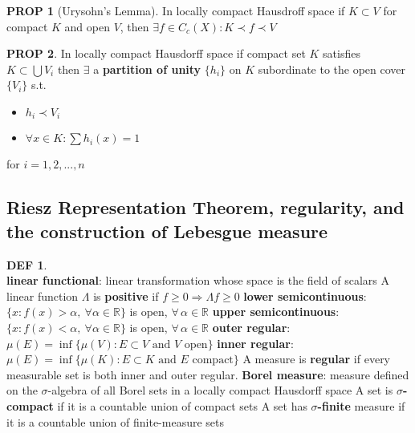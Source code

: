 \documentclass[hidelinks,10pt]{article}
\theoremstyle{definition}
\newtheorem*{defin}{DEF}
\theoremstyle{dotles}
\theoremstyle{dotless}
\newtheorem{proposition}{PROP}[section]
\theoremstyle{remark}
\begin{document}
\begin{proposition}[Urysohn's Lemma] In locally compact Hausdroff space if $K\subset V$ for compact $K$ and open $V$, then $\exists f\in C_c(X):K\prec f\prec V$
\end{proposition}

\begin{proposition}In locally compact Hausdorff space if compact set $K$ satisfies $K\subset\bigcup V_i$ then $\exists$ a \textbf{partition of unity} $\{h_i\}$ on $K$ subordinate to the open cover $\{V_i\}$ s.t.\begin{itemize}
    \item $h_i\prec V_i$
    \item $\forall x\in K:\sum h_i(x)=1$
\end{itemize}
for $i=1,2,...,n$
\end{proposition}

\subsection{Riesz Representation Theorem, regularity, and the construction of Lebesgue measure}

\begin{defin}~\\
\textbf{linear functional}: linear transformation whose space is the field of scalars\newline
A linear function $\Lambda$ is \textbf{positive} if $f\geq0\Rightarrow\Lambda f\geq0$\bigbreak
\textbf{lower semicontinuous}: $\{x:f(x)>\alpha,\ \forall\alpha\in\mathbb{R}\}$ is open, $\forall\,\alpha\in\mathbb{R}$\newline
\textbf{upper semicontinuous}: $\{x:f(x)<\alpha,\ \forall\alpha\in\mathbb{R}\}$ is open, $\forall\,\alpha\in\mathbb{R}$\bigbreak
\textbf{outer regular}: $\mu(E)=\inf\{\mu(V):E\subset V\textrm{ and }V\textrm{ open}\}$\newline
\textbf{inner regular}: $\mu(E)=\inf\{\mu(K):E\subset K\textrm{ and }E\textrm{ compact}\}$\newline
A measure is \textbf{regular} if every measurable set is both inner and outer regular.\bigbreak
\textbf{Borel measure}: measure defined on the $\sigma$-algebra of all Borel sets in a locally compact Hausdorff space\bigbreak
A set is \textbf{$\sigma$-compact} if it is a countable union of compact sets\newline
A set has \textbf{$\sigma$-finite} measure if it is a countable union of finite-measure sets
\end{defin}
\end{document}
